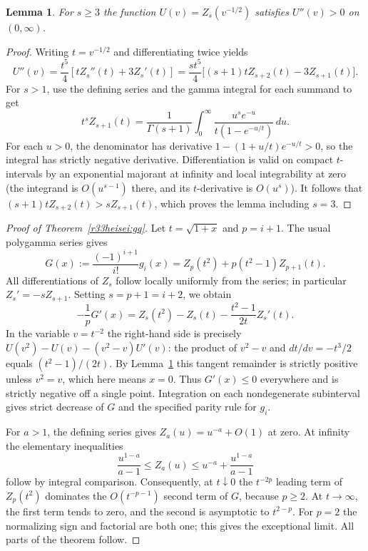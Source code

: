 \documentclass[11pt,a4paper]{article}
\numberwithin{equation}{section}
\newtheorem{lemma}[theorem]{Lemma}
\theoremstyle{definition}
\theoremstyle{remark}
\begin{document}
\begin{lemma}\label{r33heisei:curve}
For $s\ge3$ the function $U(v)=Z_s(v^{-1/2})$ satisfies $U''(v)>0$ on $(0,\infty)$.
\end{lemma}
\begin{proof}
Writing $t=v^{-1/2}$ and differentiating twice yields
\[
 U''(v)=\frac{t^5}{4}\left[t Z_s''(t)+3Z_s'(t)\right]
 =\frac{s t^5}{4}\big[(s+1)tZ_{s+2}(t)-3Z_{s+1}(t)\big].
\]
For $s>1$, use the defining series and the gamma integral for each summand to get
\begin{equation}\label{r33heisei:int}
 t^sZ_{s+1}(t)=\frac1{\Gamma(s+1)}
 \int_0^\infty\frac{u^s e^{-u}}{t(1-e^{-u/t})}\,du.
\end{equation}
For each $u>0$, the denominator has derivative
$1-(1+u/t)e^{-u/t}>0$, so the integral has strictly negative derivative. Differentiation is valid on compact $t$-intervals by an exponential majorant at infinity and local integrability at zero (the integrand is $O(u^{s-1})$ there, and its $t$-derivative is $O(u^{s})$). It follows that $(s+1)tZ_{s+2}(t)>sZ_{s+1}(t)$, which proves the lemma including $s=3$.
\end{proof}

\begin{proof}[Proof of Theorem~\ref{r33heisei:gq}]
Let $t=\sqrt{1+x}$ and $p=i+1$. The usual polygamma series gives
\[
 G(x):=\frac{(-1)^{i+1}}{i!}g_i(x)
 =Z_p(t^2)+p(t^2-1)Z_{p+1}(t).
\]
All differentiations of $Z_s$ follow locally uniformly from the series; in particular $Z_s'=-sZ_{s+1}$. Setting $s=p+1=i+2$, we obtain
\begin{equation}\label{r33heisei:rem}
 -\frac1pG'(x)=Z_s(t^2)-Z_s(t)-\frac{t^2-1}{2t}Z_s'(t).
\end{equation}
In the variable $v=t^{-2}$ the right-hand side is precisely
$U(v^2)-U(v)-(v^2-v)U'(v)$: the product of $v^2-v$ and $dt/dv=-t^3/2$ equals $(t^2-1)/(2t)$. By Lemma~\ref{r33heisei:curve} this tangent remainder is strictly positive unless $v^2=v$, which here means $x=0$. Thus $G'(x)\le0$ everywhere and is strictly negative off a single point. Integration on each nondegenerate subinterval gives strict decrease of $G$ and the specified parity rule for $g_i$.

For $a>1$, the defining series gives $Z_a(u)=u^{-a}+O(1)$ at zero. At infinity the elementary inequalities
\[
 \frac{u^{1-a}}{a-1}\le Z_a(u)\le u^{-a}+\frac{u^{1-a}}{a-1}
\]
follow by integral comparison. Consequently, at $t\downarrow0$ the $t^{-2p}$ leading term of $Z_p(t^2)$ dominates the $O(t^{-p-1})$ second term of $G$, because $p\ge2$. At $t\to\infty$, the first term tends to zero, and the second is asymptotic to $t^{2-p}$. For $p=2$ the normalizing sign and factorial are both one; this gives the exceptional limit. All parts of the theorem follow.
\end{proof}
\end{document}
